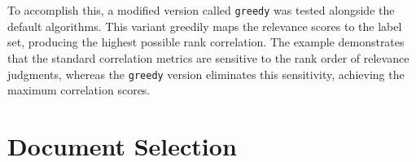\\\\
To accomplish this, a modified version called \texttt{greedy} was tested alongside the default algorithms. This variant greedily maps the relevance scores to the label set, producing the highest possible rank correlation. The example demonstrates that the standard correlation metrics are sensitive to the rank order of relevance judgments, whereas the \texttt{greedy} version eliminates this sensitivity, achieving the maximum correlation scores.


\section{Document Selection}\label{eval-document-selection}

